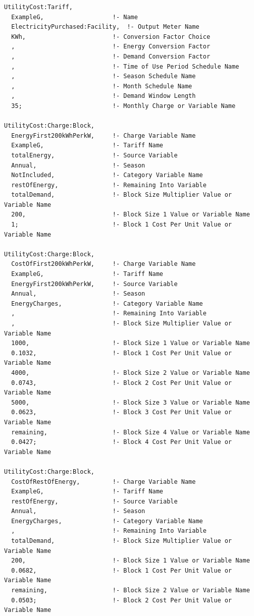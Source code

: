 \begin{lstlisting}
UtilityCost:Tariff,
  ExampleG,                   !- Name
  ElectricityPurchased:Facility,  !- Output Meter Name
  KWh,                        !- Conversion Factor Choice
  ,                           !- Energy Conversion Factor
  ,                           !- Demand Conversion Factor
  ,                           !- Time of Use Period Schedule Name
  ,                           !- Season Schedule Name
  ,                           !- Month Schedule Name
  ,                           !- Demand Window Length
  35;                         !- Monthly Charge or Variable Name

UtilityCost:Charge:Block,
  EnergyFirst200kWhPerkW,     !- Charge Variable Name
  ExampleG,                   !- Tariff Name
  totalEnergy,                !- Source Variable
  Annual,                     !- Season
  NotIncluded,                !- Category Variable Name
  restOfEnergy,               !- Remaining Into Variable
  totalDemand,                !- Block Size Multiplier Value or Variable Name
  200,                        !- Block Size 1 Value or Variable Name
  1;                          !- Block 1 Cost Per Unit Value or Variable Name

UtilityCost:Charge:Block,
  CostOfFirst200kWhPerkW,     !- Charge Variable Name
  ExampleG,                   !- Tariff Name
  EnergyFirst200kWhPerkW,     !- Source Variable
  Annual,                     !- Season
  EnergyCharges,              !- Category Variable Name
  ,                           !- Remaining Into Variable
  ,                           !- Block Size Multiplier Value or Variable Name
  1000,                       !- Block Size 1 Value or Variable Name
  0.1032,                     !- Block 1 Cost Per Unit Value or Variable Name
  4000,                       !- Block Size 2 Value or Variable Name
  0.0743,                     !- Block 2 Cost Per Unit Value or Variable Name
  5000,                       !- Block Size 3 Value or Variable Name
  0.0623,                     !- Block 3 Cost Per Unit Value or Variable Name
  remaining,                  !- Block Size 4 Value or Variable Name
  0.0427;                     !- Block 4 Cost Per Unit Value or Variable Name

UtilityCost:Charge:Block,
  CostOfRestOfEnergy,         !- Charge Variable Name
  ExampleG,                   !- Tariff Name
  restOfEnergy,               !- Source Variable
  Annual,                     !- Season
  EnergyCharges,              !- Category Variable Name
  ,                           !- Remaining Into Variable
  totalDemand,                !- Block Size Multiplier Value or Variable Name
  200,                        !- Block Size 1 Value or Variable Name
  0.0682,                     !- Block 1 Cost Per Unit Value or Variable Name
  remaining,                  !- Block Size 2 Value or Variable Name
  0.0503;                     !- Block 2 Cost Per Unit Value or Variable Name
\end{lstlisting}


